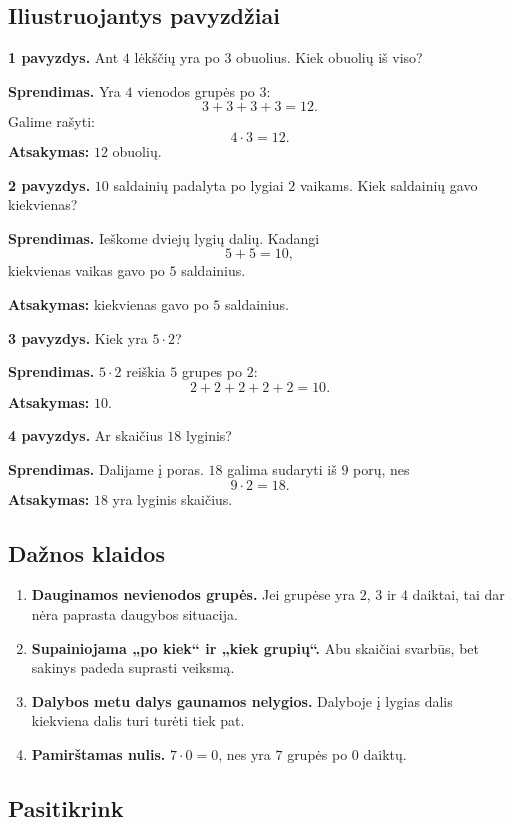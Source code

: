 \subsection{Iliustruojantys pavyzdžiai}

\textbf{1 pavyzdys.} Ant \(4\) lėkščių yra po \(3\) obuolius. Kiek obuolių iš viso?

\textbf{Sprendimas.} Yra \(4\) vienodos grupės po \(3\):
\[
3+3+3+3=12.
\]
Galime rašyti:
\[
4\cdot 3=12.
\]
\textbf{Atsakymas:} \(12\) obuolių.

\textbf{2 pavyzdys.} \(10\) saldainių padalyta po lygiai \(2\) vaikams. Kiek saldainių gavo kiekvienas?

\textbf{Sprendimas.} Ieškome dviejų lygių dalių. Kadangi
\[
5+5=10,
\]
kiekvienas vaikas gavo po \(5\) saldainius.

\textbf{Atsakymas:} kiekvienas gavo po \(5\) saldainius.

\textbf{3 pavyzdys.} Kiek yra \(5\cdot 2\)?

\textbf{Sprendimas.} \(5\cdot 2\) reiškia \(5\) grupes po \(2\):
\[
2+2+2+2+2=10.
\]
\textbf{Atsakymas:} \(10\).

\textbf{4 pavyzdys.} Ar skaičius \(18\) lyginis?

\textbf{Sprendimas.} Dalijame į poras. \(18\) galima sudaryti iš \(9\) porų, nes
\[
9\cdot 2=18.
\]
\textbf{Atsakymas:} \(18\) yra lyginis skaičius.

\subsection{Dažnos klaidos}

\begin{enumerate}
\item \textbf{Dauginamos nevienodos grupės.} Jei grupėse yra \(2\), \(3\) ir \(4\) daiktai, tai dar nėra paprasta daugybos situacija.
\item \textbf{Supainiojama „po kiek“ ir „kiek grupių“.} Abu skaičiai svarbūs, bet sakinys padeda suprasti veiksmą.
\item \textbf{Dalybos metu dalys gaunamos nelygios.} Dalyboje į lygias dalis kiekviena dalis turi turėti tiek pat.
\item \textbf{Pamirštamas nulis.} \(7\cdot 0=0\), nes yra \(7\) grupės po \(0\) daiktų.
\end{enumerate}

\subsection{Pasitikrink}

